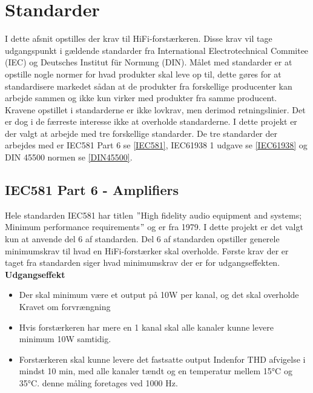 \section{Standarder}
I dette afsnit opstilles der krav til HiFi-forstærkeren. Disse krav vil tage udgangspunkt i gældende standarder fra International Electrotechnical Commitee (IEC) og Deutsches Institut f\"{u}r Normung (DIN). Målet med standarder er at opstille nogle normer for hvad produkter skal leve op til, dette gøres for at standardisere markedet sådan at de produkter fra forskellige producenter kan arbejde sammen og ikke kun virker med produkter fra samme producent. Kravene opstillet i standarderne er ikke lovkrav, men derimod retningslinier. Det er dog i de færreste interesse ikke at overholde standarderne.
\newline
\newline
I dette projekt er der valgt at arbejde med tre forskellige standarder. De tre standarder der arbejdes med er IEC581 Part 6 se \ref{IEC581}, IEC61938 1 udgave se \ref{IEC61938} og DIN 45500 normen se \ref{DIN45500}.


\subsection*{IEC581 Part 6 - Amplifiers}
\label{IEC581}
Hele standarden IEC581 har titlen $"$High fidelity audio equipment and systems; Minimum performance requirements$"$ og er fra 1979. I dette projekt er det valgt kun at anvende del 6 af standarden. Del 6 af standarden opstiller generele minimumskrav til hvad en HiFi-forstærker skal overholde. \cite{IEC581-6}%
\newline
\newline
Første krav der er taget fra standarden siger hvad minimumskrav der er for udgangseffekten.
\newline
\newline
\textbf{Udgangseffekt}
\begin{itemize}
\item Der skal minimum være et output på 10W per kanal, og det skal overholde Kravet om forvrængning
\item Hvis forstærkeren har mere en 1 kanal skal alle kanaler kunne levere minimum 10W samtidig.
\item Forstærkeren skal kunne levere det fastsatte output Indenfor THD afvigelse i mindst 10 min, med alle kanaler tændt og en temperatur mellem 15°C og 35°C. denne måling foretages ved 1000 Hz.
\end{itemize}

